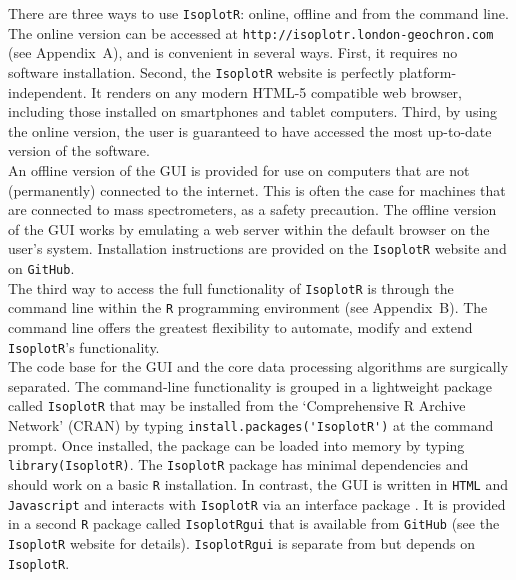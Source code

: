 \documentclass{article}
\begin{document}
There are three ways to use \texttt{IsoplotR}: online, offline and
from the command line.\\

The online version can be accessed at
\texttt{http://isoplotr.london-geochron.com} (see Appendix~A), and is
convenient in several ways. First, it requires no software
installation. Second, the \texttt{IsoplotR} website is perfectly
platform-independent. It renders on any modern HTML-5 compatible web
browser, including those installed on smartphones and tablet
computers. Third, by using the online version, the user is guaranteed
to have accessed the most up-to-date version of the software.\\

An offline version of the GUI is provided for use on computers that
are not (permanently) connected to the internet. This is often the
case for machines that are connected to mass spectrometers, as a
safety precaution. The offline version of the GUI works by emulating a
web server within the default browser on the user's
system. Installation instructions are provided on the
\texttt{IsoplotR} website and on \texttt{GitHub}.\\

The third way to access the full functionality of \texttt{IsoplotR} is
through the command line within the \texttt{R} programming environment
(see Appendix~B). The command line offers the greatest flexibility to
automate, modify and extend \texttt{IsoplotR}'s functionality.\\

The code base for the GUI and the core data processing algorithms are
surgically separated. The command-line functionality is grouped in a
lightweight package called \texttt{IsoplotR} that may be installed
from the `Comprehensive R Archive Network' (CRAN) by typing
\verb|install.packages('IsoplotR')| at the command prompt. Once
installed, the package can be loaded into memory by typing
\texttt{library(IsoplotR)}. The \texttt{IsoplotR} package has minimal
dependencies and should work on a basic \texttt{R} installation. In
contrast, the GUI is written in \texttt{HTML} and \texttt{Javascript}
and interacts with \texttt{IsoplotR} via an interface package
\citep{chang2017}. It is provided in a second \texttt{R} package
called \texttt{IsoplotRgui} that is available from \texttt{GitHub}
(see the \texttt{IsoplotR} website for details).  \texttt{IsoplotRgui}
is separate from but depends on \texttt{IsoplotR}.\\
\end{document}
